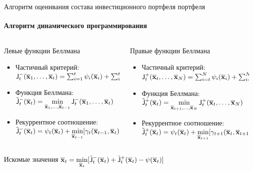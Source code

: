 \documentclass[1pt]{beamer}
\let\ov\overline
\def\bar_#1{\bold{\ov{#1}}}
\def\msf_#1{\mathsf{#1}}
\begin{document}
\begin{frame}{Алгоритм оценивания состава инвестиционного портфеля портфеля}
\framesubtitle{Алгоритм динамического программирования}
\begin{columns}[T]
\begin{column}{.5\textwidth}
   	  \begin{block}{Левые функции Беллмана}
   	  \begin{itemize}
   	  \item Частичный критерий:\ 
		$\msf_J_t^{-}(\bar_x_1, \dots, \bar_x_t) = \sum_{i=1}^t \psi_i(\bar_x_i) + \sum_{i=2}^t \gamma_i(\bar_x_{i-1}, \bar_x_i)$
		\item Функция Беллмана:\\
		$\tilde{\msf_J}_t^{-}(\bar_x_t) = \displaystyle\min_{\bar_x_1,\dots,\bar_x_{t-1}}\msf_J_t^{-}(\bar_x_1, \dots, \bar_x_t) $
		\item Рекуррентное соотношение:\
		$\tilde{\msf_J}_t^{-}(\bar_x_t) =\psi_t(\bar_x_t) +  \displaystyle\min_{\bar_x_{t-1}}[\gamma_t(\bar_x_{t-1}, \bar_x_t)+\tilde{\msf_J}_{t-1}^{-}(\bar_x_{t-1})]$
		 \end{itemize}
    \end{block}
    \end{column}
    \begin{column}{.5\textwidth}
     \begin{block}{Правые функции Беллмана}
     \begin{itemize}
   	  \item Частичный критерий:\ 
		$\msf_J_t^{+}(\bar_x_t, \dots, \bar_x_N) = \sum_{i=t}^N \psi_i(\bar_x_i) + \sum_{i=t+1}^N \gamma_i(\bar_x_{i-1}, \bar_x_i)$
		\item Функция Беллмана:\
		$\tilde{\msf_J}_t^{+}(\bar_x_t) = \displaystyle\min_{\bar_x_{t+1},\dots,\bar_x_N}\msf_J_t^{+}(\bar_x_t, \dots, \bar_x_N)$
		\item Рекуррентное соотношение:\
		$\tilde{\msf_J}_t^{+}(\bar_x_t) =\psi_t(\bar_x_t) +  \displaystyle\min_{\bar_x_{t+1}}[\gamma_{t+1}(\bar_x_{t}, \bar_x_{t+1})+\tilde{\msf_J}_{t+1}^{-}(\bar_x_{t+1})]$
		\end{itemize}
    \end{block}
    \end{column}
\end{columns}
\qquad Искомые значения $\bar_x_t = \displaystyle\min_{\bar_x_t}[\tilde{\msf_J}_t^{-}(\bar_x_t) + \tilde{\msf_J}_t^{+}(\bar_x_t) - \psi(\bar_x_t)]$
\end{frame}
\end{document}
